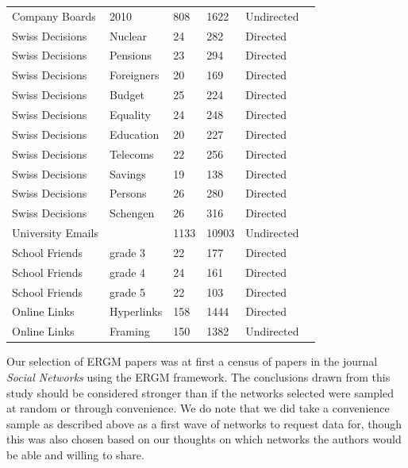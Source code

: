 \documentclass[
]{statsoc}
\begin{document}
\begin{longtable}[t]{lllllr}
Company Boards & 2010 & 808 & 1622 & Undirected & \cite{Gygax2015}\\
\addlinespace
\rowcolor{gray!6}  Swiss Decisions & Nuclear & 24 & 282 & Directed & \cite{Fischer2015}\\
Swiss Decisions & Pensions & 23 & 294 & Directed & \cite{Fischer2015}\\
\rowcolor{gray!6}  Swiss Decisions & Foreigners & 20 & 169 & Directed & \cite{Fischer2015}\\
Swiss Decisions & Budget & 25 & 224 & Directed & \cite{Fischer2015}\\
\rowcolor{gray!6}  Swiss Decisions & Equality & 24 & 248 & Directed & \cite{Fischer2015}\\
Swiss Decisions & Education & 20 & 227 & Directed & \cite{Fischer2015}\\
\rowcolor{gray!6}  Swiss Decisions & Telecoms & 22 & 256 & Directed & \cite{Fischer2015}\\
Swiss Decisions & Savings & 19 & 138 & Directed & \cite{Fischer2015}\\
\rowcolor{gray!6}  Swiss Decisions & Persons & 26 & 280 & Directed & \cite{Fischer2015}\\
Swiss Decisions & Schengen & 26 & 316 & Directed & \cite{Fischer2015}\\
\addlinespace
\rowcolor{gray!6}  University Emails &  & 1133 & 10903 & Undirected & \cite{Toivonen2009}\\
\addlinespace
School Friends & grade 3 & 22 & 177 & Directed & \cite{Anderson1999}\\
\rowcolor{gray!6}  School Friends & grade 4 & 24 & 161 & Directed & \cite{Anderson1999}\\
School Friends & grade 5 & 22 & 103 & Directed & \cite{Anderson1999}\\
\addlinespace
\rowcolor{gray!6}  Online Links & Hyperlinks & 158 & 1444 & Directed & \cite{Ackland2011}\\
Online Links & Framing & 150 & 1382 & Undirected & \cite{Ackland2011}\\
\bottomrule
\end{longtable}

Our selection of ERGM papers was at first a census of papers in the
journal \textit{ Social Networks} using the ERGM framework. The
conclusions drawn from this study should be considered stronger than if
the networks selected were sampled at random or through convenience. We
do note that we did take a convenience sample as described above as a
first wave of networks to request data for, though this was also chosen
based on our thoughts on which networks the authors would be able and
willing to share.
\end{document}
